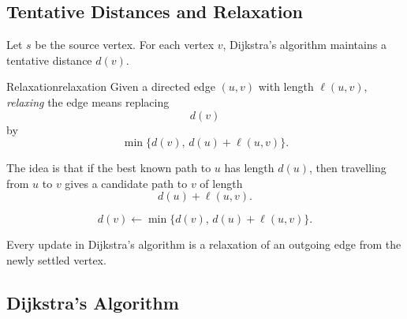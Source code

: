 \subsection{Tentative Distances and Relaxation}

Let \(s\) be the source vertex. For each vertex \(v\), Dijkstra's algorithm maintains a tentative distance \(d(v)\).

\begin{definition}{Relaxation}{relaxation}
Given a directed edge \((u,v)\) with length \(\ell(u,v)\), \emph{relaxing} the edge means replacing
\[
d(v)
\]
by
\[
\min\{d(v),\,d(u)+\ell(u,v)\}.
\]
\end{definition}

The idea is that if the best known path to \(u\) has length \(d(u)\), then travelling from \(u\) to \(v\) gives a candidate path to \(v\) of length
\[
d(u)+\ell(u,v).
\]

\begin{keyformula}[title={Relaxation update}]
\[
d(v)\leftarrow \min\{d(v),\,d(u)+\ell(u,v)\}.
\]
\end{keyformula}

\begin{center}
\end{center}

\begin{examtip}[title={Relaxation is the atomic step of Dijkstra}]
Every update in Dijkstra's algorithm is a relaxation of an outgoing edge from the newly settled vertex.
\end{examtip}

\subsection{Dijkstra's Algorithm}

